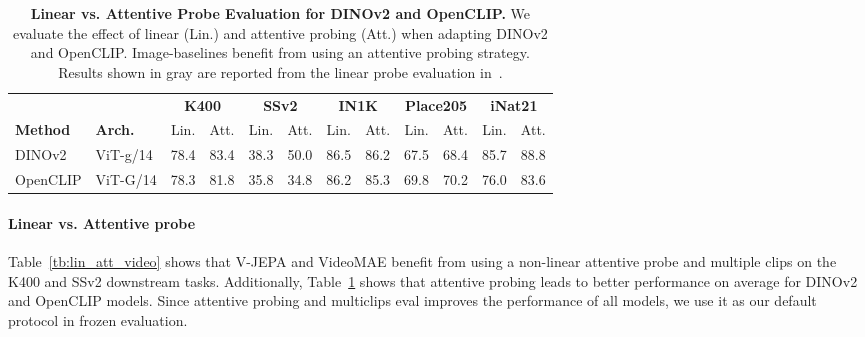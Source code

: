 \documentclass[twocolumn]{fairmeta}
\newcommand{\putalg}{{\small V-JEPA}\xspace}
\newcommand{\ccg}{\cellcolor{metabg}}
\theoremstyle{plain}
\theoremstyle{definition}
\theoremstyle{remark}
\begin{document}
\begin{table}[h]
    \centering
    \caption{\small{\bf Linear vs. Attentive Probe Evaluation for DINOv2 and OpenCLIP.} We evaluate the effect of linear (Lin.) and attentive probing (Att.) when adapting DINOv2 and OpenCLIP. Image-baselines benefit from using an attentive probing strategy. Results shown in \colorbox{gray!20}{gray} are reported from the linear probe evaluation in~\citet{oquab2023dinov2}.} 
    \label{tb:lin_att_image}
    {\fontsize{8.5pt}{8.5pt}\selectfont
    \begin{tabular}{l l c c c c c c c c c c }
        & & \multicolumn{2}{c}{\small\bf K400} & \multicolumn{2}{c}{\small\bf SSv2} &\multicolumn{2}{c}{\small\bf IN1K}  & \multicolumn{2}{c}{\small\bf Place205} & \multicolumn{2}{c}{\small\bf iNat21}\\
        \bf\small Method & \bf\small Arch. & \small Lin. & \small Att. &  \small Lin. & \small Att. & \small Lin. & \small Att. & \small Lin. &  \small Att. & \small Lin. &  \small Att.\\
        \toprule
        DINOv2 & ViT-g/14 & \ccg 78.4 & 83.4 & \ccg 38.3 & 50.0 & \ccg 86.5 & 86.2 & \ccg 67.5 & 68.4 & \ccg 85.7 & 88.8\\
        OpenCLIP & ViT-G/14 & \ccg 78.3 & 81.8 & \ccg 35.8 & 34.8  &\ccg 86.2 & 85.3 & \ccg 69.8  & 70.2 & \ccg 76.0 & 83.6\\
    \end{tabular}}
\end{table}

\paragraph{Linear vs. Attentive probe}
Table~\ref{tb:lin_att_video} shows that \putalg and VideoMAE benefit from using a non-linear attentive probe and multiple clips on the K400 and SSv2 downstream tasks.
Additionally, Table~\ref{tb:lin_att_image} shows that attentive probing leads to better performance on average for DINOv2 and OpenCLIP models.
Since attentive probing and multiclips eval improves the performance of all models, we use it as our default protocol in frozen evaluation.
\end{document}
